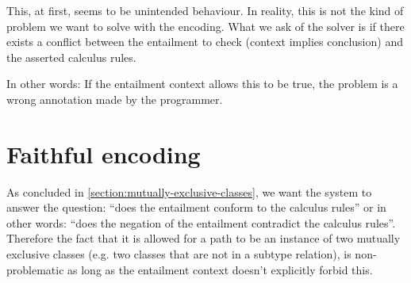 \documentclass[a4paper]{article}
\begin{document}
This, at first, seems to be unintended behaviour.
In reality, this is not the kind of problem we want to solve with the encoding.
What we ask of the solver is if there exists a conflict between
the entailment to check (context implies conclusion)
and the asserted calculus rules.

In other words: If the entailment context allows this to be true,
the problem is a wrong annotation made by the programmer.

 \section{Faithful encoding}
 As concluded in \ref{section:mutually-exclusive-classes},
 we want the system to answer the question:
 ``does the entailment conform to the calculus rules'' or in other words:
 ``does the negation of the entailment contradict the calculus rules''.
 Therefore the fact that it is allowed for a path to be an instance of
 two mutually exclusive classes (e.g. two classes that are not in a subtype relation),
 is non-problematic as long as the entailment context doesn't explicitly forbid this.


\end{document}
